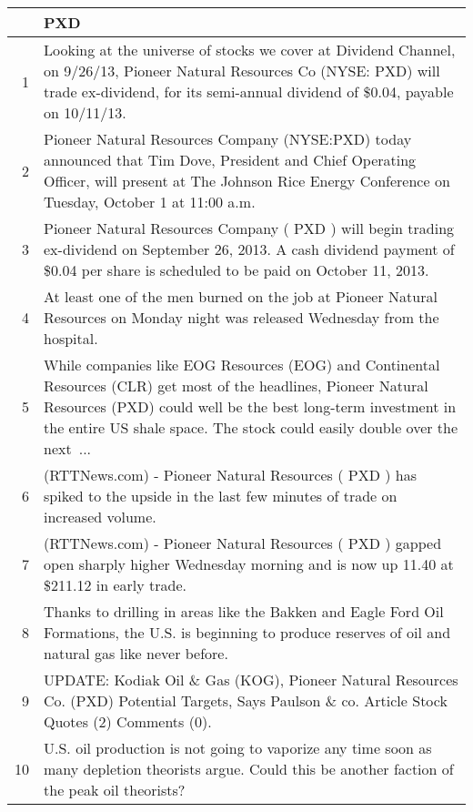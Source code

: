 \documentclass{tufte-handout}\usepackage[]{graphicx}\usepackage[]{color}
\begin{document}
\begin{tabularx}{\textwidth}{rX}
  \hline
 & PXD \\ 
  \hline
1 &  Looking at the universe of stocks we cover at Dividend Channel, on 9/26/13, Pioneer Natural Resources Co (NYSE: PXD) will trade ex-dividend, for its semi-annual dividend of \$0.04, payable on 10/11/13.  \\ 
  2 & Pioneer Natural Resources Company (NYSE:PXD) today announced that Tim Dove, President and Chief Operating Officer, will present at The Johnson Rice Energy Conference on Tuesday, October 1 at 11:00 a.m.  \\ 
  3 &  Pioneer Natural Resources Company ( PXD ) will begin trading ex-dividend on September 26, 2013. A cash dividend payment of \$0.04 per share is scheduled to be paid on October 11, 2013.  \\ 
  4 &  At least one of the men burned on the job at Pioneer Natural Resources on Monday night was released Wednesday from the hospital.  \\ 
  5 &  While companies like EOG Resources (EOG) and Continental Resources (CLR) get most of the headlines, Pioneer Natural Resources (PXD) could well be the best long-term investment in the entire US shale space. The stock could easily double over the next ...  \\ 
  6 &  (RTTNews.com) - Pioneer Natural Resources ( PXD ) has spiked to the upside in the last few minutes of trade on increased volume.  \\ 
  7 &  (RTTNews.com) - Pioneer Natural Resources ( PXD ) gapped open sharply higher Wednesday morning and is now up 11.40 at \$211.12 in early trade.  \\ 
  8 &  Thanks to drilling in areas like the Bakken and Eagle Ford Oil Formations, the U.S. is beginning to produce reserves of oil and natural gas like never before.  \\ 
  9 &  UPDATE: Kodiak Oil \& Gas (KOG), Pioneer Natural Resources Co. (PXD) Potential Targets, Says Paulson \& co. Article Stock Quotes (2) Comments (0).  \\ 
  10 &  U.S. oil production is not going to vaporize any time soon as many depletion theorists argue. Could this be another faction of the peak oil theorists?  \\ 
   \hline
\end{tabularx}
\end{document}

